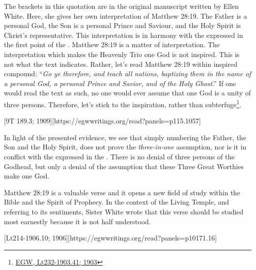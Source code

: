 The brackets in this quotation are in the original manuscript written by Ellen White. Here, she gives her own interpretation of Matthew 28:19. The Father is a personal God, the Son is a personal Prince and Saviour, and the Holy Spirit is Christ’s representative. This interpretation is in harmony with the  expressed in the first point of the . Matthew 28:19 is a matter of interpretation. The interpretation which makes the Heavenly Trio one God is not inspired. This is not what the text indicates. Rather, let's read Matthew 28:19 within inspired compound: “\textit{Go ye therefore, and teach all nations, baptizing them in the name of a personal God, a personal Prince and Savior, and of the Holy Ghost}.” If one would read the text as such, no one would ever assume that one God is a unity of three persons. Therefore, let's stick to the inspiration, rather than subterfuge\footnote{\href{https://egwwritings.org/?ref=en\_Lt232-1903.41&para=10197.50}{{EGW, Lt232-1903.41; 1903}}}.

[9T 189.3; 1909][https://egwwritings.org/read?panels=p115.1057]

In light of the presented evidence, we see that simply numbering the Father, the Son and the Holy Spirit, does not prove the \textit{three-in-one} assumption, nor is it in conflict with the  expressed in the . There is no denial of three persons of the Godhead, but only a denial of the assumption that these Three Great Worthies make one God.

Matthew 28:19 is a valuable verse and it opens a new field of study within the Bible and the Spirit of Prophecy. In the context of the Living Temple, and referring to its sentiments, Sister White wrote that this verse should be studied most earnestly because it is not half understood.

[Lt214-1906.10; 1906][https://egwwritings.org/read?panels=p10171.16]

